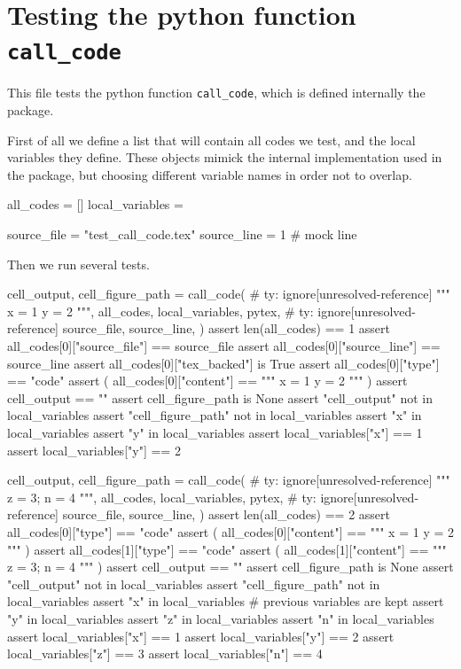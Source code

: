 \documentclass[oneside]{book}
\begin{document}
\chapter{Testing the python function \texttt{call\_code}}

This file tests the python function \texttt{call\_code}, which is defined internally the package.

First of all we define a list that will contain all codes we test, and the local variables they define. These objects mimick the internal implementation used in the package, but choosing different variable names in order not to overlap.

\begin{pycell}
all_codes = []
local_variables = {}

source_file = "test_call_code.tex"
source_line = 1  # mock line
\end{pycell}

Then we run several tests.

\begin{pycell}
cell_output, cell_figure_path = call_code(  # ty: ignore[unresolved-reference]
    """
x = 1
y = 2
""",
    all_codes,
    local_variables,
    pytex,  # ty: ignore[unresolved-reference]
    source_file,
    source_line,
)
assert len(all_codes) == 1
assert all_codes[0]["source_file"] == source_file
assert all_codes[0]["source_line"] == source_line
assert all_codes[0]["tex_backed"] is True
assert all_codes[0]["type"] == "code"
assert (
    all_codes[0]["content"]
    == """
x = 1
y = 2
"""
)
assert cell_output == ""
assert cell_figure_path is None
assert "cell_output" not in local_variables
assert "cell_figure_path" not in local_variables
assert "x" in local_variables
assert "y" in local_variables
assert local_variables["x"] == 1
assert local_variables["y"] == 2
\end{pycell}

\begin{pycell}
cell_output, cell_figure_path = call_code(  # ty: ignore[unresolved-reference]
    """
z = 3; n = 4
""",
    all_codes,
    local_variables,
    pytex,  # ty: ignore[unresolved-reference]
    source_file,
    source_line,
)
assert len(all_codes) == 2
assert all_codes[0]["type"] == "code"
assert (
    all_codes[0]["content"]
    == """
x = 1
y = 2
"""
)
assert all_codes[1]["type"] == "code"
assert (
    all_codes[1]["content"]
    == """
z = 3; n = 4
"""
)
assert cell_output == ""
assert cell_figure_path is None
assert "cell_output" not in local_variables
assert "cell_figure_path" not in local_variables
assert "x" in local_variables  # previous variables are kept
assert "y" in local_variables
assert "z" in local_variables
assert "n" in local_variables
assert local_variables["x"] == 1
assert local_variables["y"] == 2
assert local_variables["z"] == 3
assert local_variables["n"] == 4
\end{pycell}
\end{document}
